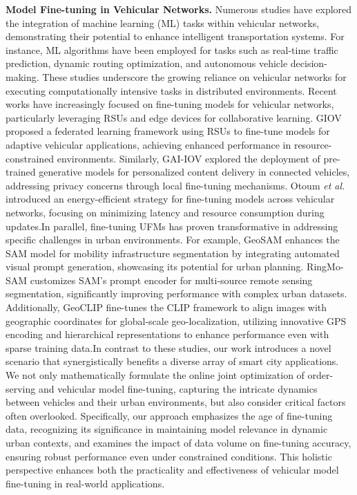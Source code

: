\smallskip
\noindent\textbf{Model Fine-tuning in Vehicular Networks.}
Numerous studies have explored the integration of machine learning (ML) tasks within vehicular networks, demonstrating their potential to enhance intelligent transportation systems. For instance, ML algorithms have been employed for tasks such as real-time traffic prediction\cite{sun2020machine,chawla2024real}, dynamic routing optimization\cite{kumar2023dynamic}, and autonomous vehicle decision-making\cite{shi2020automated}. These studies underscore the growing reliance on vehicular networks for executing computationally intensive tasks in distributed environments. Recent works have increasingly focused on fine-tuning models for vehicular networks, particularly leveraging RSUs and edge devices for collaborative learning. GIOV \cite{xie2024giov} proposed a federated learning framework using RSUs to fine-tune models for adaptive vehicular applications, achieving enhanced performance in resource-constrained environments. Similarly, GAI-IOV \cite{xie2024gai} explored the deployment of pre-trained generative models for personalized content delivery in connected vehicles, addressing privacy concerns through local fine-tuning mechanisms. Otoum \emph{et al.}~\cite{otoum2022transfer} introduced an energy-efficient strategy for fine-tuning models across vehicular networks, focusing on minimizing latency and resource consumption during updates.In parallel, fine-tuning UFMs has proven transformative in addressing specific challenges in urban environments. For example, GeoSAM \cite{sultan2023geosam} enhances the SAM \cite{kirillov2023segment} model for mobility infrastructure segmentation by integrating automated visual prompt generation, showcasing its potential for urban planning. RingMo-SAM \cite{yan2023ringmo} customizes SAM’s prompt encoder for multi-source remote sensing segmentation, significantly improving performance with complex urban datasets. Additionally, GeoCLIP \cite{vivanco2024geoclip} fine-tunes the CLIP \cite{radford2021learning} framework to align images with geographic coordinates for global-scale geo-localization, utilizing innovative GPS encoding and hierarchical representations to enhance performance even with sparse training data.In contrast to these studies, our work introduces a novel scenario that synergistically benefits a diverse array of smart city applications. We not only mathematically formulate the online joint optimization of order-serving and vehicular model fine-tuning, capturing the intricate dynamics between vehicles and their urban environments, but also consider critical factors often overlooked. Specifically, our approach emphasizes the age of fine-tuning data, recognizing its significance in maintaining model relevance in dynamic urban contexts, and examines the impact of data volume on fine-tuning accuracy, ensuring robust performance even under constrained conditions. This holistic perspective enhances both the practicality and effectiveness of vehicular model fine-tuning in real-world applications.
